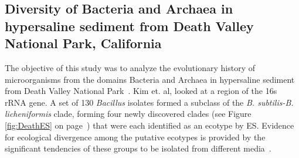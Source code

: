 %

\subsection*{Diversity of Bacteria and Archaea in hypersaline sediment from Death Valley National Park, California}
The objective of this study was to analyze the evolutionary history of microorganisms from the domains Bacteria and Archaea in hypersaline sediment from Death Valley National Park~\cite{kim2012diversity}. 
Kim et. al, looked at a region of the 16s rRNA gene.
A set of 130 \emph{Bacillus} isolates formed a subclass of the \emph{B. subtilis-B. licheniformis} clade, forming four newly discovered clades (see Figure \ref{fig:DeathES} on page~\pageref{fig:DeathES}) that were each identified as an ecotype by ES. Evidence for ecological divergence among the putative ecotypes is provided by the significant tendencies of these groups to be isolated from different media~\cite{kim2012diversity}.

